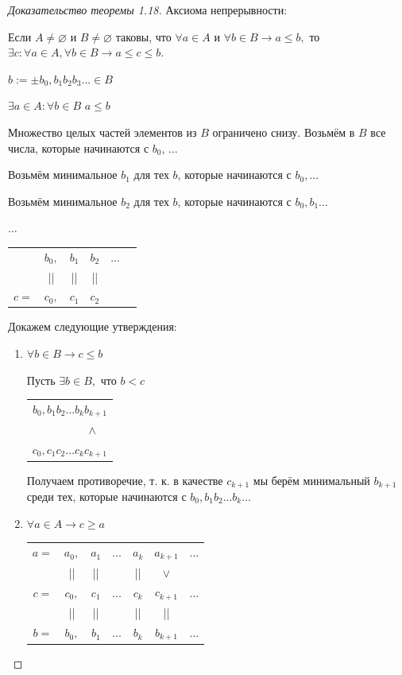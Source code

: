 	\begin{proof}[Доказательство теоремы 1.18]
		Аксиома непрерывности:
		
		Если $A \neq \varnothing$ и $B \neq \varnothing$ таковы, что $\forall a \in A$ и $\forall b \in B \rightarrow a \leqslant b,$ то $\exists c: \forall a \in A, \forall b \in B \rightarrow a \leqslant c \leqslant b.$
		
		$b := \pm b_0, b_1 b_2 b_3 ... \in B$
		
		$\exists a \in A: \forall b \in B$ $a \leqslant b$
		
		Множество целых частей элементов из $B$ ограничено снизу. Возьмём в $B$ все числа, которые начинаются с $b_0$, ...
		
		Возьмём минимальное $b_1$ для тех $b$, которые начинаются с $b_0, ...$
		
		Возьмём минимальное $b_2$ для тех $b$, которые начинаются с $b_0, b_1 ...$
		
		$\dots$
		
		\begin{tabular}{cccccc}
			& $b_0,$ & $b_1$ & $b_2$ & ... \\
			& || & || & || &  \\
			$c =$ & $c_0,$ & $c_1$ & $c_2$ &  \\
		\end{tabular}
		
		Докажем следующие утверждения:
		\begin{enumerate}
			\item $\forall b \in B \rightarrow c \leqslant b$
			
			Пусть $\exists b \in B,$ что $b < c$
			
			\begin{center}
				\begin{tabular}{r}
					$b_0, b_1 b_2 \dots b_k b_{k + 1}$ \\
					$\wedge$ $\text{ }$ \\
					$c_0, c_1 c_2 \dots c_k c_{k + 1}$ \\
				\end{tabular}
			\end{center}
			
			Получаем противоречие, т. к. в качестве $c_{k + 1}$ мы берём минимальный $b_{k + 1}$ среди тех, которые начинаются с $b_0, b_1 b_2 ... b_k ...$
			
			\item $\forall a \in A \rightarrow c \geqslant a$
			
			\begin{center}
				\begin{tabular}{ccccccc}
					$a =$ & $a_0,$ & $a_1$ & $\dots$ & $a_k$ & $a_{k + 1}$ & $\dots$ \\
					& || & || & & || & $\vee$ & \\
					$c =$ & $c_0,$ & $c_1$ & $\dots$ & $c_k$ & $c_{k + 1}$ & $\dots$ \\
					& || & || & & || & || & \\
					$b =$ & $b_0,$ & $b_1$ & $\dots$ & $b_k$ & $b_{k + 1}$ & $\dots$ \\
				\end{tabular}
			\end{center}
			

\end{enumerate}
\end{proof}
